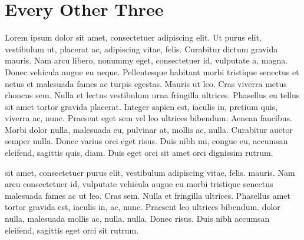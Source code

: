 \documentclass{article}
\begin{document}
\newpage
\section{Every Other Three}
\begin{minipage}[t]{.5\textwidth}
Lorem ipsum dolor sit amet, consectetuer adipiscing elit. Ut purus
elit, vestibulum ut, placerat ac, adipiscing vitae, felis. Curabitur
dictum gravida mauris. Nam arcu libero, nonummy eget, consectetuer
id, vulputate a, magna. Donec vehicula augue eu neque. Pellentesque
habitant morbi tristique senectus et netus et malesuada fames ac
turpis egestas. Mauris ut leo. Cras viverra metus rhoncus sem. Nulla
et lectus vestibulum urna fringilla ultrices. Phasellus eu tellus
sit amet tortor gravida placerat. Integer sapien est, iaculis in,
pretium quis, viverra ac, nunc. Praesent eget sem vel leo ultrices
bibendum. Aenean faucibus. Morbi dolor nulla, malesuada eu, pulvinar
at, mollis ac, nulla. Curabitur auctor semper nulla.  Donec varius orci
eget risus. Duis nibh mi, congue eu, accumsan eleifend, sagittis quis,
diam. Duis eget orci sit amet orci dignissim rutrum.
\end{minipage}
\begin{minipage}[t]{.5\textwidth}
 sit amet, consectetuer  purus elit, vestibulum  adipiscing
vitae, felis.  mauris. Nam arcu
 consectetuer id, vulputate  vehicula augue eu 
morbi tristique senectus  malesuada fames ac
 ut leo. Cras  sem. Nulla et  fringilla
ultrices. Phasellus  amet tortor gravida
 est, iaculis in,  ac, nunc. Praesent  leo ultrices
bibendum.  dolor nulla, malesuada
 mollis ac, nulla.  nulla.  Donec  risus. Duis nibh
 accumsan eleifend, sagittis  eget orci sit  rutrum.
\end{minipage}

\newpage
\end{document}
